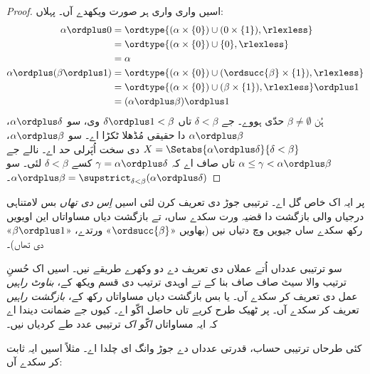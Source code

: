 \documentclass[../../../include/open-logic-section]{subfiles}
\begin{document}
\begin{proof}
اسیں واری واری ہر صورت ویکھدے آں۔ پہلاں:
\begin{align*}
	\alpha \ordplus  0 
	& = \ordtype{(\alpha \times \{0\}) \cup (0 \times \{1\}), \rlexless} \\
	&= \ordtype{(\alpha \times \{0\}) \cup \{0\}, \rlexless}\\
	&= \alpha\\
	\alpha \ordplus (\beta \ordplus  1) 
	&= \ordtype{(\alpha\times \{0\}) \cup (\ordsucc{\beta}\times \{1\}), \rlexless} \\
	&= \ordtype{(\alpha\times \{0\}) \cup (\beta \times \{1\}), \rlexless} \ordplus 1\\
	&= (\alpha \ordplus  \beta) \ordplus  1
\end{align*}
ہُن $\beta \neq \emptyset$ حدّی ہووے۔ جے $\delta < \beta$ تاں $\delta\ordplus 1 < \beta$ وی، سو $\alpha \ordplus  \delta$، $\alpha \ordplus  \beta$ دا حقیقی مُڈھلا ٹکڑا اے۔ سو $\alpha
\ordplus  \beta$، $X = \Setabs{\alpha
\ordplus  \delta}{\delta < \beta}$ دی سخت اُپَرلی حد اے۔ نالے جے $\alpha \leq \gamma <
\alpha \ordplus  \beta$ تاں صاف اے کہ $\gamma = \alpha \ordplus
\delta$ کسے $\delta < \beta$ لئی۔ سو $\alpha \ordplus  \beta =
\supstrict_{\delta< \beta}(\alpha\ordplus \delta)$۔
\end{proof}

پر ایہ اک خاص گل اے۔ ترتیبی جوڑ دی تعریف کرن لئی اسیں \emph{اِس دی تھاں} بس لامتناہی درجیاں والی بازگشت دا قضیہ ورت سکدے ساں، تے بازگشت دیاں مساواتاں این اویویں رکھ سکدے ساں جیویں  وچ دتیاں نیں (بھاویں «$\ordsucc{\beta}$» ورتدے، «$\beta \ordplus 1$» دی تھاں)۔

سو ترتیبی عدداں اُتے عملاں دی تعریف دے دو وکھرے طریقے نیں۔ اسیں اک حُسنِ ترتیب والا سیٹ صاف صاف بنا کے تے اوہدی ترتیب دی قسم ویکھ کے، \emph{بناوٹ راہیں} عمل دی تعریف کر سکدے آں۔ یا بس بازگشت دیاں مساواتاں رکھ کے، \emph{بازگشت راہیں} تعریف کر سکدے آں۔ پر ٹھیک طرح کریے تاں حاصل اکّو اے۔ کیوں جے  ضمانت دیندا اے کہ ایہ مساواتاں \emph{اکّو اک} ترتیبی عدد طے کردیاں نیں۔

کئی طرحاں ترتیبی حساب، قدرتی عدداں دے جوڑ وانگ ای چلدا اے۔ مثلاً اسیں ایہ ثابت کر سکدے آں:
\end{document}
